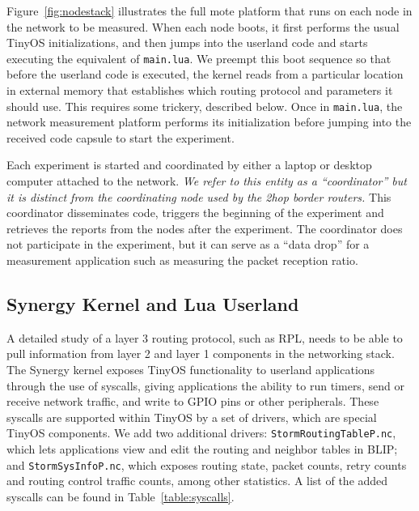Figure~\ref{fig:nodestack} illustrates the full mote platform that runs on each node in the network to be measured.
When each node boots, it first performs the usual TinyOS initializations, and then jumps into the userland code and starts executing the equivalent of \texttt{main.lua}.
We preempt this boot sequence so that before the userland code is executed, the kernel reads from a particular location in external memory that establishes which routing protocol and parameters it should use.
This requires some trickery, described below.
Once in \texttt{main.lua}, the network measurement platform performs its initialization before jumping into the received code capsule to start the experiment.

Each experiment is started and coordinated by either a laptop or desktop computer attached to the network.
\emph{We refer to this entity as a ``coordinator'' but it is distinct from the coordinating node used by the 2hop border routers.}
This coordinator disseminates code, triggers the beginning of the experiment and retrieves the reports from the nodes after the experiment.
The coordinator does not participate in the experiment, but it can serve as a ``data drop'' for a measurement application such as measuring the packet reception ratio.


\subsection{Synergy Kernel and Lua Userland}

A detailed study of a layer 3 routing protocol, such as RPL, needs to be able to pull information from layer 2 and layer 1 components in the networking stack.
The Synergy kernel exposes TinyOS functionality to userland applications through the use of syscalls, giving applications the ability to run timers, send or receive network traffic, and write to GPIO pins or other peripherals.
These syscalls are supported within TinyOS by a set of drivers, which are special TinyOS components.
We add two additional drivers: \texttt{StormRoutingTableP.nc}, which lets applications view and edit the routing and neighbor tables in BLIP; and \texttt{StormSysInfoP.nc}, which exposes routing state, packet counts, retry counts and routing control traffic counts, among other statistics.
A list of the added syscalls can be found in Table~\ref{table:syscalls}.

